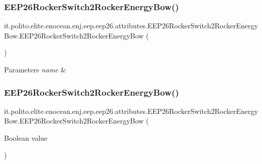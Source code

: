 \subsubsection{\texorpdfstring{E\+E\+P26\+Rocker\+Switch2\+Rocker\+Energy\+Bow()}{EEP26RockerSwitch2RockerEnergyBow()}\hspace{0.1cm}{\footnotesize\ttfamily [1/2]}}
{\footnotesize\ttfamily it.\+polito.\+elite.\+enocean.\+enj.\+eep.\+eep26.\+attributes.\+E\+E\+P26\+Rocker\+Switch2\+Rocker\+Energy\+Bow.\+E\+E\+P26\+Rocker\+Switch2\+Rocker\+Energy\+Bow (\begin{DoxyParamCaption}{ }\end{DoxyParamCaption})}


\begin{DoxyParams}{Parameters}
{\em name} & \\
\hline
\end{DoxyParams}
\hypertarget{classit_1_1polito_1_1elite_1_1enocean_1_1enj_1_1eep_1_1eep26_1_1attributes_1_1_e_e_p26_rocker_switch2_rocker_energy_bow_a841bc5ba953b44525a34ff8633b8fac1}{}\label{classit_1_1polito_1_1elite_1_1enocean_1_1enj_1_1eep_1_1eep26_1_1attributes_1_1_e_e_p26_rocker_switch2_rocker_energy_bow_a841bc5ba953b44525a34ff8633b8fac1} 
\subsubsection{\texorpdfstring{E\+E\+P26\+Rocker\+Switch2\+Rocker\+Energy\+Bow()}{EEP26RockerSwitch2RockerEnergyBow()}\hspace{0.1cm}{\footnotesize\ttfamily [2/2]}}
{\footnotesize\ttfamily it.\+polito.\+elite.\+enocean.\+enj.\+eep.\+eep26.\+attributes.\+E\+E\+P26\+Rocker\+Switch2\+Rocker\+Energy\+Bow.\+E\+E\+P26\+Rocker\+Switch2\+Rocker\+Energy\+Bow (\begin{DoxyParamCaption}\item[{Boolean}]{value }\end{DoxyParamCaption})}



